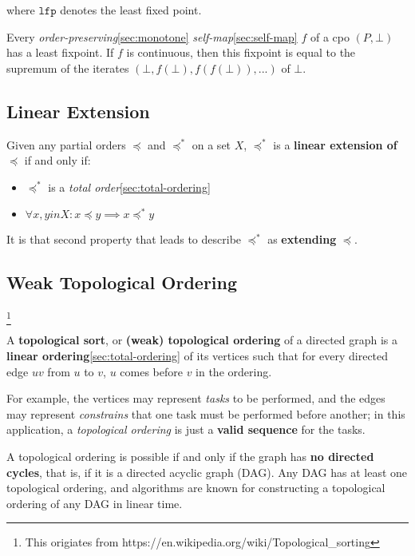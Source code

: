 where $\mathtt{lfp}$ denotes the least fixed point.


Every \textit{order-preserving}\ref{sec:monotone}
\textit{self-map}\ref{sec:self-map} $f$ of a cpo $(P, \bot)$ has a
least fixpoint. If $f$ is continuous, then this fixpoint is equal to
the supremum of the iterates $(\bot, f(\bot), f(f(\bot)), ...)$ of
$\bot$.


\subsection{Linear Extension}
\label{sec:linear-extension}

Given any partial orders $\preceq$ and $\preceq^*$ on a set $X$,
$\preceq^*$ is a \textbf{linear extension of $\preceq$} if and only if:

\begin{itemize}
\item $\preceq^*$ is a \textit{total order}\ref{sec:total-ordering}
\item $\forall x, y in X: x \preceq y \implies x \preceq^* y$
\end{itemize}

It is that second property that leads to describe $\preceq^*$ as
\textbf{extending} $\preceq$.


\subsection{Weak Topological Ordering}
\label{sec:wto}

\footnote{This origiates from https://en.wikipedia.org/wiki/Topological\_sorting}

A \textbf{topological sort}, or \textbf{(weak) topological ordering}
of a directed graph is a \textbf{linear
  ordering}\ref{sec:total-ordering} of its vertices such that for
every directed edge $uv$ from $u$ to $v$, $u$ comes before $v$ in the
ordering.

For example, the vertices may represent \textit{tasks} to be
performed, and the edges may represent \textit{constrains} that one
task must be performed before another; in this application, a
\textit{topological ordering} is just a \textbf{valid sequence} for
the tasks.

A topological ordering is possible if and only if the graph has
\textbf{no directed cycles}, that is, if it is a directed acyclic
graph (DAG). Any DAG has at least one topological ordering, and
algorithms are known for constructing a topological ordering of any
DAG in linear time.

